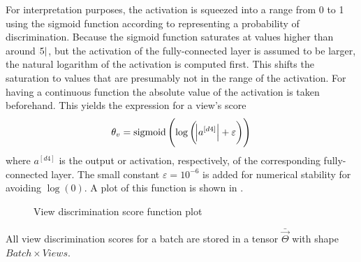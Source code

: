 For interpretation purposes, the activation is squeezed into a range from 0 to 1 using the sigmoid function according to \cite{Feng2018} representing a probability of discrimination.
Because the sigmoid function saturates at values higher than around $\abs{5}$, but the activation of the fully-connected layer is assumed to be larger, the natural logarithm of the activation is computed first.
This shifts the saturation to values that are presumably not in the range of the activation.
For having a continuous function the absolute value of the activation is taken beforehand.
This yields the expression for a view's score
\begin{equation}
	\label{eq:view-discrimination-score}
	\theta_v = \operatorname{sigmoid}\left( \log \left( \abs{a^{[d4]}} + \varepsilon \right) \right)
\end{equation}
where $a^{[d4]}$ is the output or activation, respectively, of the corresponding fully-connected layer.
The small constant $\varepsilon=10^{-6}$ is added for numerical stability for avoiding $\log(0)$.
A plot of this function is shown in .
\begin{figure}
	\setlength{}
	\setlength{}
	\centering
	
	\caption{View discrimination score function plot}
	\label{fig:view-discrimination-score}
\end{figure}
All view discrimination scores for a batch are stored in a tensor $\bar{\vec{\Theta}}$ with shape $Batch \times Views$.

